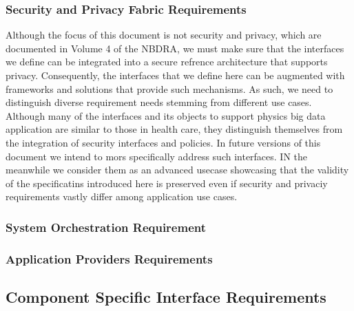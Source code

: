 \documentclass[10pt]{article}
\begin{document}
\subsubsection{Security and Privacy Fabric Requirements}

Although the focus of this document is not security and privacy, which
are documented in Volume 4 of the NBDRA, we must make sure that the
interfaces we define can be integrated into a secure refrence
architecture that supports privacy. Consequently, the interfaces that
we define here can be augmented with frameworks and solutions that
provide such mechanisms. As such, we need to distinguish diverse
requirement needs stemming from different use cases. Although many of
the interfaces and its objects to support physics big data application
are similar to those in health care, they distinguish themselves from
the integration of security interfaces and policies. In future
versions of this document we intend to mors specifically address such
interfaces. IN the meanwhile we consider them as an advanced usecase
showcasing that the validity of the specificatins introduced here is
preserved even if security and privaciy requirements vastly differ
among application use cases.

\subsubsection{System Orchestration Requirement}


\subsubsection{Application Providers Requirements}


\subsection{Component Specific Interface Requirements}
\end{document}
